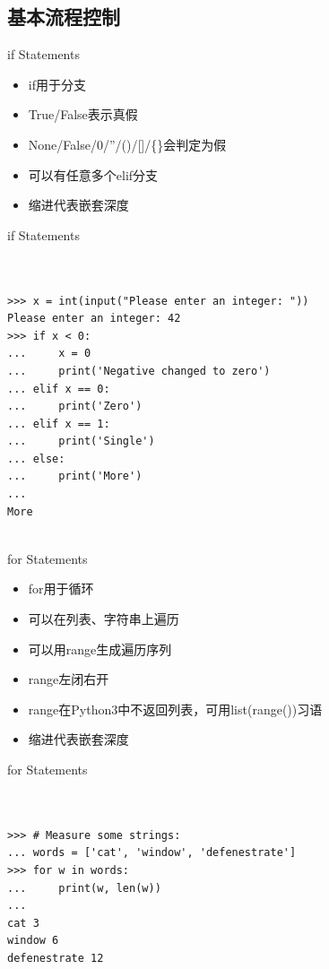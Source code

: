 \documentclass{beamer}
\begin{document}
\subsection{基本流程控制}
\begin{frame}[t]{if Statements}


	\begin{itemize}
		\item if用于分支
		\item True/False表示真假
		\item None/False/0/''/()/[]/\{\}会判定为假
		\item 可以有任意多个elif分支
		\item 缩进代表嵌套深度
	\end{itemize}

\end{frame}


\begin{frame}[t,fragile]{if Statements}


\begin{verbatim}


>>> x = int(input("Please enter an integer: "))
Please enter an integer: 42
>>> if x < 0:
...     x = 0
...     print('Negative changed to zero')
... elif x == 0:
...     print('Zero')
... elif x == 1:
...     print('Single')
... else:
...     print('More')
...
More


\end{verbatim}


\end{frame}


\begin{frame}[t]{for Statements}

	\begin{itemize}
		\item for用于循环
		\item 可以在列表、字符串上遍历
		\item 可以用range生成遍历序列
		\item range左闭右开
		\item range在Python3中不返回列表，可用list(range())习语
		\item 缩进代表嵌套深度
	\end{itemize}

\end{frame}


\begin{frame}[t,fragile]{for Statements}


\begin{verbatim}


>>> # Measure some strings:
... words = ['cat', 'window', 'defenestrate']
>>> for w in words:
...     print(w, len(w))
...
cat 3
window 6
defenestrate 12


\end{verbatim}


\end{frame}
\end{document}
